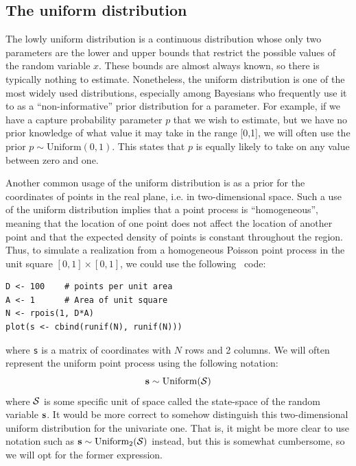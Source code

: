 \subsection{The uniform distribution}

The %
lowly uniform distribution is a continuous distribution whose
only two parameters are the lower and upper bounds that restrict the
possible values of the random variable $x$. These bounds
are almost always known, so there is typically nothing to
estimate. Nonetheless, the uniform
distribution is one of the most widely used distributions,
especially among Bayesians who frequently use it to as a ``non-informative''
prior distribution for a parameter. For example, if we
have a capture probability parameter $p$ that we wish to estimate, but
we have no prior knowledge of what value it may take in the range
[0,1], we will often use the prior $p \sim \text{Uniform}(0,1)$. This
states that $p$ is equally likely to take on any value between
zero and one.

Another common usage of the uniform distribution is as a prior for the
coordinates of points in the real plane, i.e. in two-dimensional
space. Such a use of the uniform distribution implies that a point process is
``homogeneous'', meaning that the location of one point does not
affect the location of another point and that the expected density of
points is constant throughout the region. Thus, to simulate a
realization from a homogeneous Poisson point process in the unit square
$[0,1] \times [0,1]$, we could use the following \R~code:
\begin{verbatim}
D <- 100    # points per unit area
A <- 1      # Area of unit square
N <- rpois(1, D*A)
plot(s <- cbind(runif(N), runif(N)))
\end{verbatim}
where \verb+s+ is a matrix of coordinates with $N$ rows and 2 columns. We
will often represent the uniform point process using the following notation:
\begin{equation}
  {\bf s} \sim \text{Uniform}(\mathcal{S})
\end{equation}
where ${\cal S}$ is some specific unit of space called the state-space
of the random variable ${\bf s}$.
It would be more correct to somehow distinguish this
two-dimensional uniform distribution for the univariate one. That is,
it might be more clear to use notation such as
${\bf s} \sim \text{Uniform}_2(\mathcal{S})$ instead, but this is somewhat
cumbersome, so we will opt for the former expression.


